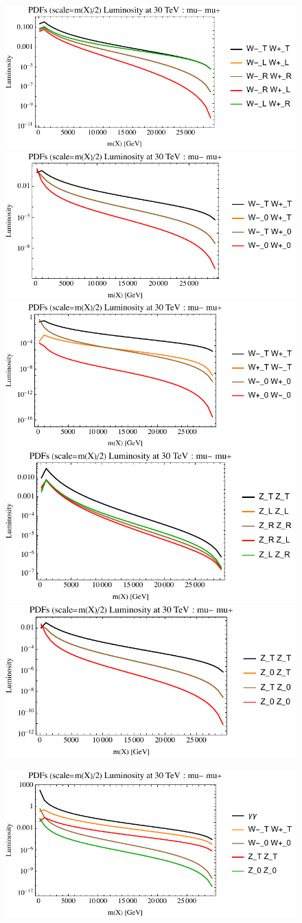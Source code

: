 \documentclass[a4paper,11pt]{article}
\begin{document}
\begin{figure}[ht]
\includegraphics[width=0.46\linewidth]{PlotLumi/30TeV/lumis/plotWWpolRandL.pdf}
\includegraphics[width=0.46\linewidth]{PlotLumi/30TeV/lumis/plotWWpolTand0.pdf}
\includegraphics[width=0.46\linewidth]{PlotLumi/30TeV/lumis/plotWmWpandWpWm.pdf}
\includegraphics[width=0.46\linewidth]{PlotLumi/30TeV/lumis/plotZZpolRandL.pdf}
\includegraphics[width=0.46\linewidth]{PlotLumi/30TeV/lumis/plotZZpolTand0.pdf}
\end{figure}

\begin{figure}
\includegraphics[width=0.46\linewidth]{PlotLumi/30TeV/lumis/plotgammaWZ.pdf}
\end{figure}
\end{document}
